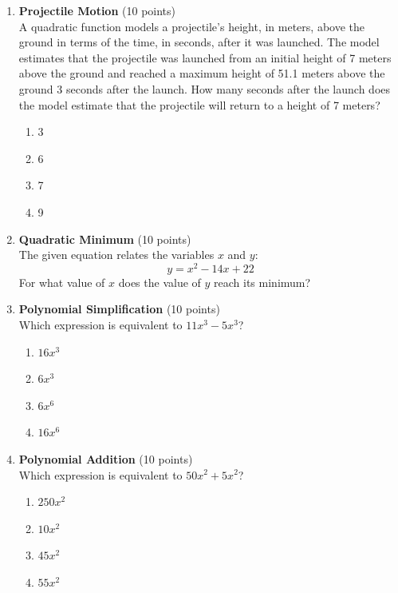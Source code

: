 \begin{enumerate}
  \item \textbf{Projectile Motion} (10 points)\\
  A quadratic function models a projectile's height, in meters, above the ground in terms of the time, in seconds, after it was launched. The model estimates that the projectile was launched from an initial height of 7 meters above the ground and reached a maximum height of 51.1 meters above the ground 3 seconds after the launch. How many seconds after the launch does the model estimate that the projectile will return to a height of 7 meters?
  \begin{enumerate}[label=(\Alph*)]
    \item 3
    \item 6
    \item 7
    \item 9
  \end{enumerate}
  \begin{subanswer}
  \end{subanswer}

  \item \textbf{Quadratic Minimum} (10 points)\\
  The given equation relates the variables $x$ and $y$:
  \[
    y=x^{2}-14x+22
  \]
  For what value of $x$ does the value of $y$ reach its minimum?
  \begin{subanswer}
  \end{subanswer}

  \newpage

  \item \textbf{Polynomial Simplification} (10 points)\\
  Which expression is equivalent to $11x^{3}-5x^{3}$?
  \begin{enumerate}[label=(\Alph*)]
    \item $16x^{3}$
    \item $6x^{3}$
    \item $6x^{6}$
    \item $16x^{6}$
  \end{enumerate}
  \begin{subanswer}
  \end{subanswer}

  \item \textbf{Polynomial Addition} (10 points)\\
  Which expression is equivalent to $50x^{2}+5x^{2}$?
  \begin{enumerate}[label=(\Alph*)]
    \item $250x^{2}$
    \item $10x^{2}$
    \item $45x^{2}$
    \item $55x^{2}$
  \end{enumerate}
  \begin{subanswer}
  \end{subanswer}


\end{enumerate}
